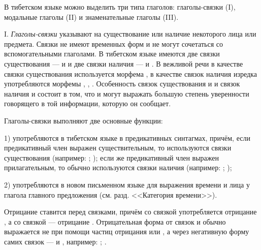В тибетском языке можно выделить три типа глаголов: глаголы-связки (I), модальные глаголы (II) и знаменательные глаголы (III).

I. \emph{Глаголы-связки} указывают на существование или наличие некоторого лица или предмета. Связки не имеют временных форм и не могут сочетаться со вспомогательными глаголами. В тибетском языке имеются две связки существования ---  и  и две связки наличия ---  и . В вежливой речи в качестве связки существования используется морфема , в качестве связок наличия изредка употребляются морфемы , , . Особенность связок существования  и  и связок наличия  и  состоит в том, что  и  могут выражать большую степень уверенности говорящего в той информации, которую он сообщает.

Глаголы-связки выполняют две основные функции:

1) употребляются в тибетском языке в предикативных синтагмах, причём, если предикативный член выражен существительным, то используются связки существования
(например: ;
);
если же предикативный член выражен прилагательным, то обычно используются связки наличия (например: ;
);

2) употребляются в новом письменном языке для выражения времени и лица у глагола главного предложения (см. разд. <<Категория времени>>).

Отрицание ставится перед связками, причём со связкой  употребляется отрицание , а со связкой  --- отрицание . Отрицательная форма от связок  и  обычно выражается не при помощи частиц отрицания  или , а через негативную форму самих связок ---  и , например:
;
.

